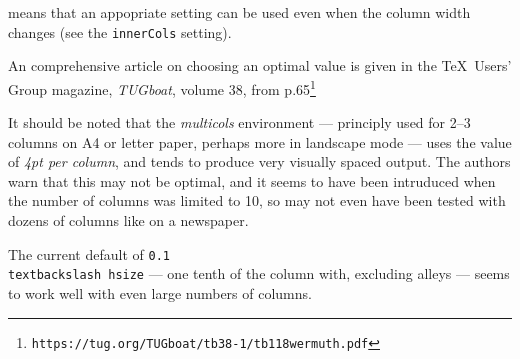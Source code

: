 \documentclass[a4paper,DIV=11]{scrartcl}
\begin{document}
\begin{multicols}{2}
{  means that an appopriate setting can be used even when the column
  width changes (see the \texttt{innerCols} setting).\par
  An comprehensive article on choosing an optimal value is given in the
  \TeX\ Users' Group magazine, \textit{TUGboat}, volume 38, from p.65\footnote{
  \texttt{https://tug.org/TUGboat/tb38-1/tb118wermuth.pdf}} \par
  It should be noted that the \textit{multicols} environment ---
  principly used for 2--3 columns on A4 or letter paper, perhaps more
  in landscape mode --- uses the value of \textit{4pt per column}, and
  tends to produce very visually spaced output. The authors warn that
  this may not be optimal, and it seems to have been intruduced when
  the number of columns was limited to 10, so may not even have been
  tested with dozens of columns like on a newspaper.
  \par
  The current default of \texttt{0.1\\textbackslash hsize} --- one
  tenth of the column with, excluding alleys --- seems to
  work well with even large numbers of columns.
}
\end{multicols}
\end{document}
